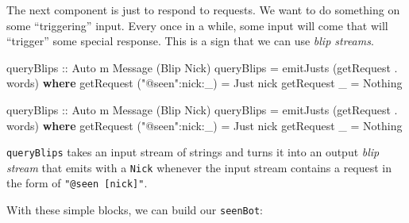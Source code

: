 \documentclass[]{article}
\newenvironment{Shaded}{}{}
\newcommand{\KeywordTok}[1]{\textcolor[rgb]{0.00,0.44,0.13}{\textbf{{#1}}}}
\newcommand{\DataTypeTok}[1]{\textcolor[rgb]{0.56,0.13,0.00}{{#1}}}
\newcommand{\StringTok}[1]{\textcolor[rgb]{0.25,0.44,0.63}{{#1}}}
\newcommand{\OtherTok}[1]{\textcolor[rgb]{0.00,0.44,0.13}{{#1}}}
\newcommand{\FunctionTok}[1]{\textcolor[rgb]{0.02,0.16,0.49}{{#1}}}
\newcommand{\NormalTok}[1]{{#1}}
\begin{document}
The next component is just to respond to requests. We want to do
something on some ``triggering'' input. Every once in a while, some
input will come that will ``trigger'' some special response. This is a
sign that we can use \emph{blip streams}.

\begin{Shaded}
\begin{Highlighting}[]
\OtherTok{    queryBlips ::} \DataTypeTok{Auto} \NormalTok{m }\DataTypeTok{Message} \NormalTok{(}\DataTypeTok{Blip} \DataTypeTok{Nick}\NormalTok{)}
    \NormalTok{queryBlips }\FunctionTok{=} \NormalTok{emitJusts (getRequest }\FunctionTok{.} \NormalTok{words)}
      \KeywordTok{where}
        \NormalTok{getRequest (}\StringTok{"@seen"}\FunctionTok{:}\NormalTok{nick}\FunctionTok{:}\NormalTok{_) }\FunctionTok{=} \DataTypeTok{Just} \NormalTok{nick}
        \NormalTok{getRequest _                }\FunctionTok{=} \DataTypeTok{Nothing}



\OtherTok{queryBlips ::} \DataTypeTok{Auto} \NormalTok{m }\DataTypeTok{Message} \NormalTok{(}\DataTypeTok{Blip} \DataTypeTok{Nick}\NormalTok{)}
\NormalTok{queryBlips }\FunctionTok{=} \NormalTok{emitJusts (getRequest }\FunctionTok{.} \NormalTok{words)}
  \KeywordTok{where}
    \NormalTok{getRequest (}\StringTok{"@seen"}\FunctionTok{:}\NormalTok{nick}\FunctionTok{:}\NormalTok{_) }\FunctionTok{=} \DataTypeTok{Just} \NormalTok{nick}
    \NormalTok{getRequest _                }\FunctionTok{=} \DataTypeTok{Nothing}
\end{Highlighting}
\end{Shaded}

\texttt{queryBlips} takes an input stream of strings and turns it into
an output \emph{blip stream} that emits with a \texttt{Nick} whenever
the input stream contains a request in the form of
\texttt{"@seen\ {[}nick{]}"}.

With these simple blocks, we can build our \texttt{seenBot}:
\end{document}
